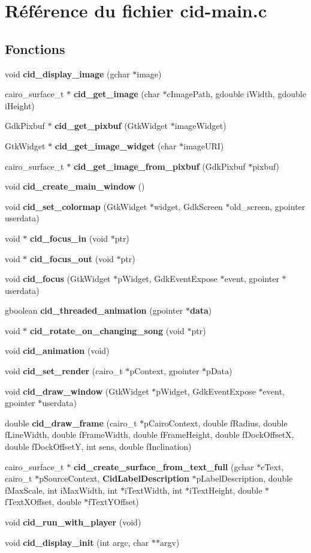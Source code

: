 \section{Référence du fichier cid-main.c}
\label{cid-main_8c}
\subsection*{Fonctions}
\begin{CompactItemize}
\item 
void {\bf cid\_\-display\_\-image} (gchar $\ast$image)
\item 
cairo\_\-surface\_\-t $\ast$ {\bf cid\_\-get\_\-image} (char $\ast$cImagePath, gdouble iWidth, gdouble iHeight)
\item 
GdkPixbuf $\ast$ {\bf cid\_\-get\_\-pixbuf} (GtkWidget $\ast$imageWidget)
\item 
GtkWidget $\ast$ {\bf cid\_\-get\_\-image\_\-widget} (char $\ast$imageURI)
\item 
cairo\_\-surface\_\-t $\ast$ {\bf cid\_\-get\_\-image\_\-from\_\-pixbuf} (GdkPixbuf $\ast$pixbuf)
\item 
void {\bf cid\_\-create\_\-main\_\-window} ()
\item 
void {\bf cid\_\-set\_\-colormap} (GtkWidget $\ast$widget, GdkScreen $\ast$old\_\-screen, gpointer userdata)
\item 
void $\ast$ {\bf cid\_\-focus\_\-in} (void $\ast$ptr)
\item 
void $\ast$ {\bf cid\_\-focus\_\-out} (void $\ast$ptr)
\item 
void {\bf cid\_\-focus} (GtkWidget $\ast$pWidget, GdkEventExpose $\ast$event, gpointer $\ast$userdata)
\item 
gboolean {\bf cid\_\-threaded\_\-animation} (gpointer $\ast${\bf data})
\item 
void $\ast$ {\bf cid\_\-rotate\_\-on\_\-changing\_\-song} (void $\ast$ptr)
\item 
void {\bf cid\_\-animation} (void)
\item 
void {\bf cid\_\-set\_\-render} (cairo\_\-t $\ast$pContext, gpointer $\ast$pData)
\item 
void {\bf cid\_\-draw\_\-window} (GtkWidget $\ast$pWidget, GdkEventExpose $\ast$event, gpointer $\ast$userdata)
\item 
double {\bf cid\_\-draw\_\-frame} (cairo\_\-t $\ast$pCairoContext, double fRadius, double fLineWidth, double fFrameWidth, double fFrameHeight, double fDockOffsetX, double fDockOffsetY, int sens, double fInclination)
\item 
cairo\_\-surface\_\-t $\ast$ {\bf cid\_\-create\_\-surface\_\-from\_\-text\_\-full} (gchar $\ast$cText, cairo\_\-t $\ast$pSourceContext, {\bf CidLabelDescription} $\ast$pLabelDescription, double fMaxScale, int iMaxWidth, int $\ast$iTextWidth, int $\ast$iTextHeight, double $\ast$fTextXOffset, double $\ast$fTextYOffset)
\item 
void {\bf cid\_\-run\_\-with\_\-player} (void)
\item 
void {\bf cid\_\-display\_\-init} (int argc, char $\ast$$\ast$argv)
\end{CompactItemize}
